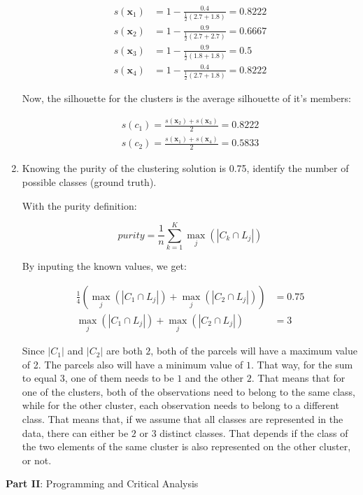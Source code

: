 \documentclass[12pt]{article}
\begin{document}
\begin{enumerate}[leftmargin=\labelsep]
    \begin{equation}
    \begin{aligned}
        s(\mathbf{x}_1) &= 1 - \frac{0.4}{\frac{1}{2}(2.7+1.8)} = 0.8222 \\
        s(\mathbf{x}_2) &= 1 - \frac{0.9}{\frac{1}{2}(2.7+2.7)} = 0.6667 \\
        s(\mathbf{x}_3) &= 1 - \frac{0.9}{\frac{1}{2}(1.8+1.8)} = 0.5 \\
        s(\mathbf{x}_4) &= 1 - \frac{0.4}{\frac{1}{2}(2.7+1.8)} = 0.8222
    \end{aligned}
    \end{equation}

    Now, the silhouette for the clusters is the average silhouette of it's members:

    \begin{equation}
    \begin{aligned}
        s(c_1) = \frac{s(\mathbf{x}_2) + s(\mathbf{x}_3)}{2} = 0.8222 \\
        s(c_2) = \frac{s(\mathbf{x}_1) + s(\mathbf{x}_4)}{2} = 0.5833
    \end{aligned}
    \end{equation}

    \item Knowing the purity of the clustering solution is 0.75, identify the number of possible classes
    (ground truth).

    With the purity definition:

    \begin{equation}
        purity = \frac{1}{n} \sum_{k=1}^{K} \max_j(|C_k \cap L_j|)
    \end{equation}

    By inputing the known values, we get:

    \begin{equation}
    \begin{aligned}
        \frac{1}{4}(\max_j(|C_1 \cap L_j|) + \max_j(|C_2 \cap L_j|)) &= 0.75 \\
        \max_j(|C_1 \cap L_j|) + \max_j(|C_2 \cap L_j|) &= 3
    \end{aligned}
    \end{equation}

    Since $|C_1|$ and $|C_2|$ are both $2$, both of the parcels will have a maximum value of 2. The parcels also will have a minimum value of $1$. That way, for the sum to equal $3$, one of them needs to be $1$ and the other $2$. That means that for one of the clusters, both of the observations need to belong to the same class, while for the other cluster, each observation needs to belong to a different class. That means that, if we assume that all classes are represented in the data, there can either be $2$ or $3$ distinct classes. That depends if the class of the two elements of the same cluster is also represented on the other cluster, or not.
\end{enumerate}

\vskip 10cm

\large{\textbf{Part II}: Programming and Critical Analysis}\normalsize
\end{document}
